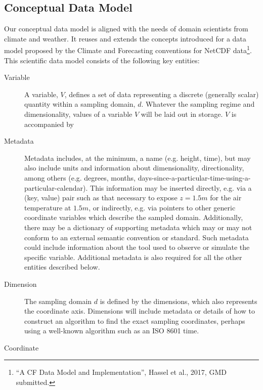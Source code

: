 \subsection{Conceptual Data Model}
\label{subsec: conceptual data model}

\tab
Our conceptual data model is aligned with the needs of domain scientists from climate and weather. It reuses and extends the concepts introduced for a data model proposed by the Climate and Forecasting conventions for NetCDF data\footnote{``A CF Data Model and Implementation'', Hassel et al., 2017, GMD submitted.}.
This scientific data model consists of the following key entities:

\begin{description}

\item[Variable]

A variable, $V$, defines a set of data representing a discrete (generally scalar) quantity within a sampling domain, $d$.  Whatever the sampling regime and dimensionality, values of a variable $V$ will be laid out in storage. $V$ is accompanied by

\item[Metadata]

Metadata includes, at the minimum, a name (e.g. height, time), but may also include units and information about dimensionality, directionality, among others (e.g. degrees, months, days-since-a-particular-time-using-a-particular-calendar). This information may be inserted directly, e.g. via a (key, value) pair such as that necessary to expose $z=1.5m$ for the air temperature at $1.5m$, or indirectly, e.g. via pointers to other generic coordinate variables which describe the sampled domain. Additionally, there may be a dictionary of supporting metadata which may or may not conform to an external semantic convention or standard. Such metadata could include information about the tool used to observe or simulate the specific variable.  Additional metadata is also required for all the other entities described below.

\item[Dimension]

The sampling domain $d$ is defined by the dimensions, which also represents the coordinate axis. Dimensions will include metadata or details of how to construct an algorithm to find the exact sampling coordinates, perhaps using a well-known algorithm such as an ISO 8601 time.

\item[Coordinate]


\end{description}
